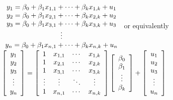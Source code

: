 \documentclass{article}%
\begin{document}
$%
\begin{array}
[c]{c}%
y_{1}=\beta_{0}+\beta_{1}x_{1,1}+\cdots+\beta_{k}x_{1,k}+u_{1}\\
y_{2}=\beta_{0}+\beta_{1}x_{2,1}+\cdots+\beta_{k}x_{2,k}+u_{2}\\
y_{3}=\beta_{0}+\beta_{1}x_{3,1}+\cdots+\beta_{k}x_{3,k}+u_{3}\\
\vdots\\
y_{n}=\beta_{0}+\beta_{1}x_{n,1}+\cdots+\beta_{k}x_{n,k}+u_{n}%
\end{array}
$ or equivalently $\left[
\begin{array}
[c]{c}%
y_{1}\\
y_{2}\\
y_{3}\\
\vdots\\
y_{n}%
\end{array}
\right]  =\left[
\begin{array}
[c]{cccc}%
1 & x_{1,1} & \cdots & x_{1,k}\\
1 & x_{2,1} & \cdots & x_{2,k}\\
1 & x_{3,1} & \cdots & x_{3,k}\\
\vdots & \vdots & \ddots & \vdots\\
1 & x_{n,1} & \cdots & x_{n,k}%
\end{array}
\right]  \left[
\begin{array}
[c]{c}%
\beta_{0}\\
\beta_{1}\\
\vdots\\
\beta_{k}%
\end{array}
\right]  +\left[
\begin{array}
[c]{c}%
u_{1}\\
u_{2}\\
u_{3}\\
\vdots\\
u_{n}%
\end{array}
\right]  $
\end{document}
